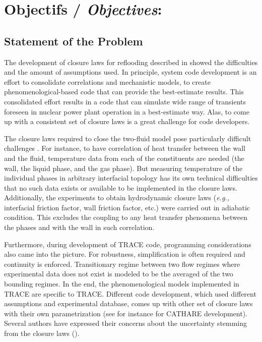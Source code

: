 \documentclass[11pt,titlepage]{article}
\begin{document}
\newpage
\section{Objectifs /  {\large\textit{Objectives}}:}

\subsection{Statement of the Problem}

The development of closure laws for reflooding described in \cite{Nelson1992} showed the difficulties and the amount of assumptions used. 
In principle, system code development is an effort to consolidate correlations and mechanistic models, to create phenomenological-based code that can provide the best-estimate results. 
This consolidated effort results in a code that can simulate wide range of transients foreseen in nuclear power plant operation in a best-estimate way. 
Alas, to come up with a consistent set of closure laws is a great challenge for code developers.

The closure laws required to close the two-fluid model pose particularly difficult challenges \cite{Wulff2007}. 
For instance, to have correlation of heat transfer between the wall and the fluid, temperature data from each of the constituents are needed (the wall, the liquid phase, and the gas phase). 
But measuring temperature of the individual phases in arbitrary interfacial topology has its own technical difficulties that no such data exists or available to be implemented in the closure laws.
Additionally, the experiments to obtain hydrodynamic closure laws (\textit{e.g.,} interfacial friction factor, wall friction factor, etc.) were carried out in adiabatic condition. 
This excludes the coupling to any heat transfer phenomena between the phases and with the wall in such correlation. 

Furthermore, during development of TRACE code, programming considerations also came into the picture. 
For robustness, simplification is often required and continuity is enforced. 
Transitionary regime between two flow regimes where experimental data does not exist is modeled to be the averaged of the two bounding regimes. 
In the end, the phenomenological models implemented in TRACE are specific to TRACE. 
Different code development, which used different assumptions and experimental database, comes up with other set of closure laws with their own parametrization (see for instance \cite{Bestion1990} for CATHARE development). 
Several authors have expressed their concerns about the uncertainty stemming from the closure laws (\cite{Wulff2007, DAuria2012, Petruzzi2008}).
\end{document}
